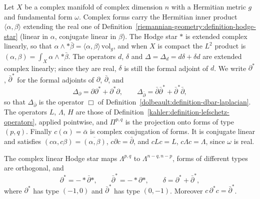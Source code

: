 \begin{notation}\label{hodge-decomposition:notation-hermitian-forms}
Let $X$ be a complex manifold of complex dimension $n$ with a Hermitian metric $g$ and fundamental form $\omega$. Complex forms carry the
Hermitian inner product $\langle\alpha, \beta\rangle$ extending the real one of Definition~\ref{riemannian-geometry:definition-hodge-star}
(linear in $\alpha$, conjugate linear in $\beta$). The Hodge star $*$ is extended complex linearly, so that
$\alpha \wedge *\bar\beta = \langle\alpha, \beta\rangle\,\mathrm{vol}_g$, and when $X$ is compact the $L^2$ product is
$(\alpha, \beta) = \int_X\alpha \wedge *\bar\beta$. The operators $d$, $\delta$ and $\Delta = \Delta_d = d\delta + \delta d$ are extended
complex linearly; since they are real, $\delta$ is still the formal adjoint of $d$. We write $\partial^*$, $\bar\partial^*$ for the formal
adjoints of $\partial$, $\bar\partial$, and
\[
\Delta_\partial = \partial\partial^* + \partial^*\partial, \qquad \Delta_{\bar\partial} = \bar\partial\bar\partial^* + \bar\partial^*\bar\partial,
\]
so that $\Delta_{\bar\partial}$ is the operator $\Box$ of Definition~\ref{dolbeault:definition-dbar-laplacian}. The operators $L$,
$\Lambda$, $H$ are those of Definition~\ref{kahler:definition-lefschetz-operators}, applied pointwise, and $\Pi^{p,q}$ is the projection
onto forms of type $(p,q)$. Finally $c(\alpha) = \bar\alpha$ is complex conjugation of forms. It is conjugate linear and satisfies
$(c\alpha, c\beta) = \overline{(\alpha, \beta)}$, $c\partial c = \bar\partial$, and $cLc = L$, $c\Lambda c = \Lambda$, since
$\omega$ is real.
\end{notation}

\begin{lemma}\label{hodge-decomposition:lemma-adjoints-by-type}
The complex linear Hodge star maps $\Lambda^{p,q}$ to $\Lambda^{n-q,n-p}$, forms of different types are orthogonal, and
\[
\partial^* = -*\bar\partial*, \qquad \bar\partial^* = -*\partial*, \qquad \delta = \partial^* + \bar\partial^*,
\]
where $\partial^*$ has type $(-1, 0)$ and $\bar\partial^*$ has type $(0, -1)$. Moreover $c\,\partial^*c = \bar\partial^*$.
\end{lemma}


